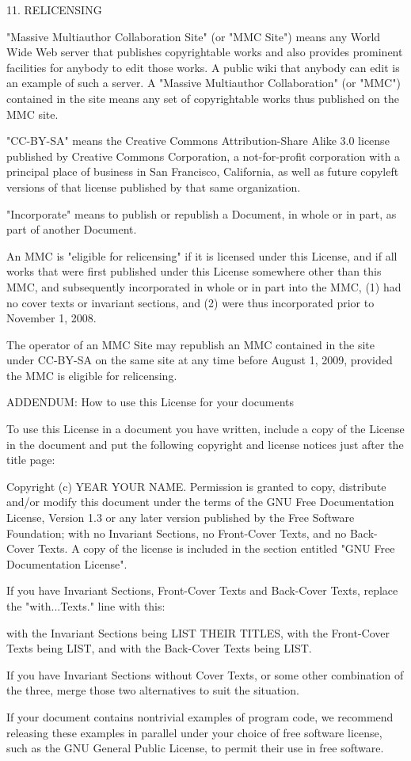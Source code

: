 \documentclass[11pt]{article}
\begin{document}
11. RELICENSING

"Massive Multiauthor Collaboration Site" (or "MMC Site") means any
World Wide Web server that publishes copyrightable works and also
provides prominent facilities for anybody to edit those works.  A
public wiki that anybody can edit is an example of such a server.  A
"Massive Multiauthor Collaboration" (or "MMC") contained in the site
means any set of copyrightable works thus published on the MMC site.

"CC-BY-SA" means the Creative Commons Attribution-Share Alike 3.0 
license published by Creative Commons Corporation, a not-for-profit 
corporation with a principal place of business in San Francisco, 
California, as well as future copyleft versions of that license 
published by that same organization.

"Incorporate" means to publish or republish a Document, in whole or in 
part, as part of another Document.

An MMC is "eligible for relicensing" if it is licensed under this 
License, and if all works that were first published under this License 
somewhere other than this MMC, and subsequently incorporated in whole or 
in part into the MMC, (1) had no cover texts or invariant sections, and 
(2) were thus incorporated prior to November 1, 2008.

The operator of an MMC Site may republish an MMC contained in the site
under CC-BY-SA on the same site at any time before August 1, 2009,
provided the MMC is eligible for relicensing.


ADDENDUM: How to use this License for your documents

To use this License in a document you have written, include a copy of
the License in the document and put the following copyright and
license notices just after the title page:

    Copyright (c)  YEAR  YOUR NAME.
    Permission is granted to copy, distribute and/or modify this document
    under the terms of the GNU Free Documentation License, Version 1.3
    or any later version published by the Free Software Foundation;
    with no Invariant Sections, no Front-Cover Texts, and no Back-Cover Texts.
    A copy of the license is included in the section entitled "GNU
    Free Documentation License".

If you have Invariant Sections, Front-Cover Texts and Back-Cover Texts,
replace the "with...Texts." line with this:

    with the Invariant Sections being LIST THEIR TITLES, with the
    Front-Cover Texts being LIST, and with the Back-Cover Texts being LIST.

If you have Invariant Sections without Cover Texts, or some other
combination of the three, merge those two alternatives to suit the
situation.

If your document contains nontrivial examples of program code, we
recommend releasing these examples in parallel under your choice of
free software license, such as the GNU General Public License,
to permit their use in free software.
\end{document}
